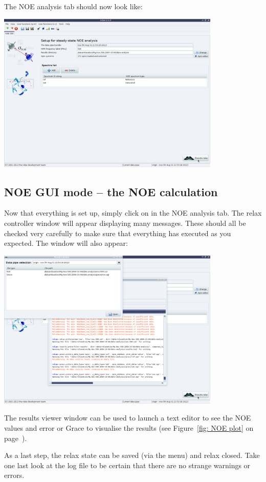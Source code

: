 The NOE analysis tab should now look like:

\begin{minipage}[h]{\linewidth}
\centerline{\includegraphics[width=0.8\textwidth, bb=14 14 1415 1019]{graphics/screenshots/noe_analysis/analysis_tab2}}
\end{minipage}



\subsection{NOE GUI mode -- the NOE calculation}

Now that everything is set up, simply click on  in the NOE analysis tab.  The relax controller window will appear displaying many messages.  These should all be checked very carefully to make sure that everything has executed as you expected.  The  window will also appear:

\begin{minipage}[h]{\linewidth}
\centerline{\includegraphics[width=0.8\textwidth, bb=14 14 1415 1019]{graphics/screenshots/noe_analysis/fin}}
\end{minipage}

The results viewer window can be used to launch a text editor to see the NOE values and error or Grace to visualise the results (see Figure~\ref{fig: NOE plot} on page~\pageref{fig: NOE plot}).

As a last step, the relax state can be saved (via the  menu) and relax closed.  Take one last look at the  log file to be certain that there are no strange warnings or errors.

